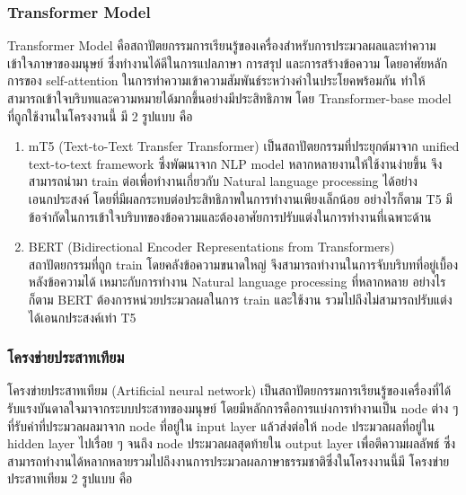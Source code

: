 \documentclass[14pt,oneside,openright,a4paper]{cpe-thai-project}
\begin{document}
\newpage

  \subsubsection {Transformer Model}
   Transformer Model \cite{Transformers} คือสถาปัตยกรรมการเรียนรู้ของเครื่องสำหรับการประมวลผลและทำความเข้าใจภาษาของมนุษย์ ซึ่งทำงานได้ดีในการแปลภาษา การสรุป และการสร้างข้อความ 
   โดยอาศัยหลักการของ self-attention ในการทำความเข้าความสัมพันธ์ระหว่างคำในประโยคพร้อมกัน ทำให้สามารถเข้าใจบริบทและความหมายได้มากขึ้นอย่างมีประสิทธิภาพ 
   โดย Transformer-base model ที่ถูกใช้งานในโครงงานนี้ มี 2 รูปแบบ คือ 
   
   \begin{enumerate}
   \item mT5 (Text-to-Text Transfer Transformer) เป็นสถาปัตยกรรมที่ประยุกต์มาจาก unified text-to-text framework ซึ่งพัฒนาจาก NLP model หลากหลายงานให้ใช้งานง่ายขึ้น จึงสามารถนำมา train ต่อเพื่อทำงานเกี่ยวกับ Natural language processing ได้อย่างเอนกประสงค์ โดยที่มีผลกระทบต่อประสิทธิภาพในการทำงานเพียงเล็กน้อย อย่างไรก็ตาม T5 มีข้อจำกัดในการเข้าใจบริบทของข้อความและต้องอาศัยการปรับแต่งในการทำงานที่เฉพาะด้าน
   \item BERT (Bidirectional Encoder Representations from Transformers) \cite{BERT}  สถาปัตยกรรมที่ถูก train โดยคลังข้อความขนาดใหญ่ จึงสามารถทำงานในการจับบริบทที่อยู่เบื้องหลังข้อความได้ เหมาะกับการทำงาน Natural language processing ที่หลากหลาย อย่างไรก็ตาม BERT ต้องการหน่วยประมวลผลในการ train และใช้งาน รวมไปถึงไม่สามารถปรับแต่งได้เอนกประสงค์เท่า T5 
   \end{enumerate} 
   
   \subsubsection {โครงข่ายประสาทเทียม}
   โครงข่ายประสาทเทียม (Artificial neural network) เป็นสถาปัตยกรรมการเรียนรู้ของเครื่องที่ได้รับแรงบันดาลใจมาจากระบบประสาทของมนุษย์ โดยมีหลักการคือการแบ่งการทำงานเป็น node ต่าง ๆ 
   ที่รับค่าที่ประมวลผลมาจาก node ที่อยู่ใน input layer แล้วส่งต่อให้ node ประมวลผลที่อยู่ใน hidden layer ไปเรื่อย ๆ จนถึง node ประมวลผลสุดท้ายใน output layer 
   เพื่อตีความผลลัพธ์ ซึ่งสามารถทำงานได้หลากหลายรวมไปถึงงานการประมวลผลภาษาธรรมชาติซึ่งในโครงงานนี้มี โครงข่ายประสาทเทียม 2  รูปแบบ คือ
   
\end{document}
